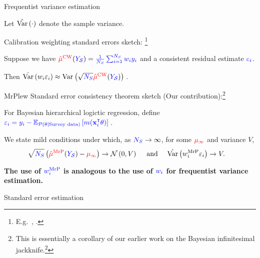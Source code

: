 \begin{frame}[c]{Frequentist variance estimation}


Let $\hat{\mathrm{Var}}\left(\cdot\right)$ denote the sample variance.

\begin{block}{Calibration weighting standard errors sketch:
    \footnote{E.g.~, \textcite{deville:1993:generalizedraking,fuller:2011:sampling}.}
}

Suppose we have $\textcolor{red}{\hat{\mu}^{\mathrm{CW}}}(\textcolor{blue}{\textcolor{blue}{Y_{\mathcal{S}}}}) = \textcolor{blue}{\frac{1}{{\textcolor{blue}{N_S}}} \sum_{i=1}^{\textcolor{blue}{N_S}} w_i y_i}$ and a
consistent residual estimate $\textcolor{blue}{\varepsilon_i}$.

Then $\hat{\mathrm{Var}}\left(w_i \varepsilon_i\right) \approx \mathrm{Var}_{}\left( \sqrt{{\textcolor{blue}{N_S}}} \textcolor{red}{\hat{\mu}^{\mathrm{CW}}}(\textcolor{blue}{\textcolor{blue}{Y_{\mathcal{S}}}})\right)\,$.

\end{block}
\pause

\begin{block}{MrPlew Standard error consistency theorem sketch (Our contribution):\footnote{
This is essentially a corollary of our earlier work on the Bayesian infinitesimal jackknife.\footcite{giordano:2024:bayesij}
}}

For Bayesian hierarchical logictic regression, define
$\textcolor{blue}{\varepsilon_i = y_i - \mathbb{E}_{\textcolor{blue}{\mathcal{P}(\theta \vert \textrm{Survey data})}}\left[ m(\mathbf{x}_i^\intercal \theta)\right]\,}$.

We state mild conditions under which, as ${\textcolor{blue}{N_S}} \rightarrow \infty$,
for some $\textcolor{red}{\mu_\infty}$ and variance $V$,
$$
\begin{aligned}
    \sqrt{{\textcolor{blue}{N_S}}}\left(\textcolor{red}{\hat{\mu}^{\mathrm{MrP}}}(\textcolor{blue}{\textcolor{blue}{Y_{\mathcal{S}}}}) - \textcolor{red}{\mu_\infty} \right) \rightarrow{}&
    \mathcal{N}\left(0, V\right)
    \quad\textrm{ and }\quad
    \hat{\mathrm{Var}}\left( w_i^{\mathrm{MrP}} \varepsilon_i\right)
    \rightarrow{} V.
\end{aligned}
$$
\end{block}

\textbf{The use of $\textcolor{blue}{w_i^{\mathrm{MrP}}}$ is analogous to the use of $\textcolor{blue}{w_i}$
for frequentist variance estimation.}


\end{frame}



\begin{frame}[t]{Standard error estimation}
\BootstrapPlot{}
\end{frame}


